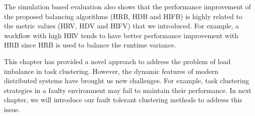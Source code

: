 The simulation based evaluation also shows that the performance improvement of the proposed balancing algorithms (HRB, HDB and HIFB) is highly related to the metric values (HRV, HDV and HIFV) that we introduced. For example, a workflow with high HRV tends to have better performance improvement with HRB since HRB is used to balance the runtime variance. 

This chapter has provided a novel approach to address the problem of load imbalance in task clustering. However, the dynamic features of modern distributed systems have brought us new challenges. For example, task clustering strategies in a faulty environment may fail to maintain their performance. In next chapter, we will introduce our fault tolerant clustering methods to address this issue. 

